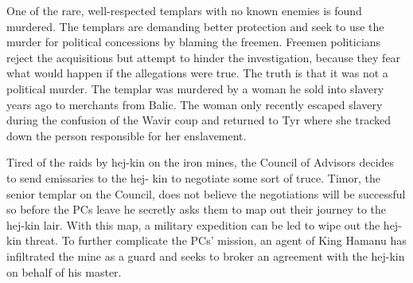 {	\item One of the rare, well-respected templars with no known enemies is found murdered. The templars are demanding better protection and seek to use the murder for political concessions by blaming the freemen. Freemen politicians reject the acquisitions but attempt to hinder the investigation, because they fear what would happen if the allegations were true. The truth is that it was not a political murder. The templar was murdered by a woman he sold into slavery years ago to merchants from Balic. The woman only recently escaped slavery during the confusion of the Wavir coup and returned to Tyr where she tracked down the person responsible for her enslavement.
	\item Tired of the raids by hej-kin on the iron mines, the Council of Advisors decides to send emissaries to the hej- kin to negotiate some sort of truce. Timor, the senior templar on the Council, does not believe the negotiations will be successful so before the PCs leave he secretly asks them to map out their journey to the hej-kin lair. With this map, a military expedition can be led to wipe out the hej- kin threat. To further complicate the PCs' mission, an agent of King Hamanu has infiltrated the mine as a guard and seeks to broker an agreement with the hej-kin on behalf of his master.
}